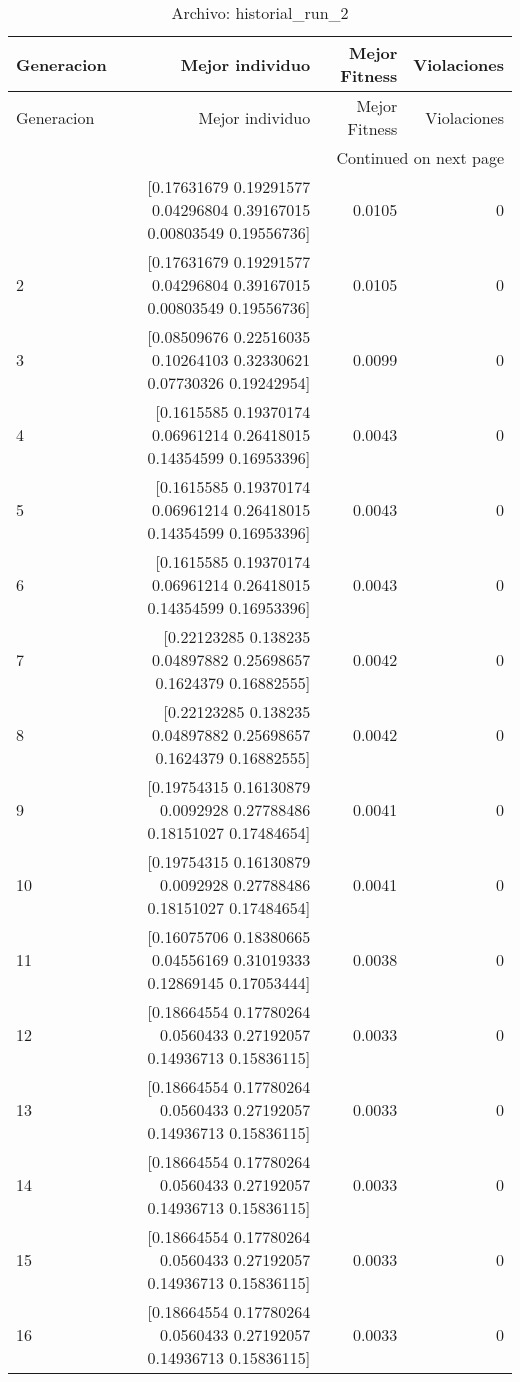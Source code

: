 \begin{longtable}{lrrr}
\caption{Archivo: historial\_run\_2}\label{tab:historial_run_2} \\
\toprule
Generacion & Mejor individuo & Mejor Fitness & Violaciones \\
\midrule
\endfirsthead
\toprule
Generacion & Mejor individuo & Mejor Fitness & Violaciones \\
\midrule
\endhead
\midrule
\multicolumn{4}{r}{Continued on next page} \\
\midrule
\endfoot
\bottomrule
\endlastfoot
1 & [0.17631679 0.19291577 0.04296804 0.39167015 0.00803549 0.19556736] & 0.0105 & 0 \\
2 & [0.17631679 0.19291577 0.04296804 0.39167015 0.00803549 0.19556736] & 0.0105 & 0 \\
3 & [0.08509676 0.22516035 0.10264103 0.32330621 0.07730326 0.19242954] & 0.0099 & 0 \\
4 & [0.1615585  0.19370174 0.06961214 0.26418015 0.14354599 0.16953396] & 0.0043 & 0 \\
5 & [0.1615585  0.19370174 0.06961214 0.26418015 0.14354599 0.16953396] & 0.0043 & 0 \\
6 & [0.1615585  0.19370174 0.06961214 0.26418015 0.14354599 0.16953396] & 0.0043 & 0 \\
7 & [0.22123285 0.138235   0.04897882 0.25698657 0.1624379  0.16882555] & 0.0042 & 0 \\
8 & [0.22123285 0.138235   0.04897882 0.25698657 0.1624379  0.16882555] & 0.0042 & 0 \\
9 & [0.19754315 0.16130879 0.0092928  0.27788486 0.18151027 0.17484654] & 0.0041 & 0 \\
10 & [0.19754315 0.16130879 0.0092928  0.27788486 0.18151027 0.17484654] & 0.0041 & 0 \\
11 & [0.16075706 0.18380665 0.04556169 0.31019333 0.12869145 0.17053444] & 0.0038 & 0 \\
12 & [0.18664554 0.17780264 0.0560433  0.27192057 0.14936713 0.15836115] & 0.0033 & 0 \\
13 & [0.18664554 0.17780264 0.0560433  0.27192057 0.14936713 0.15836115] & 0.0033 & 0 \\
14 & [0.18664554 0.17780264 0.0560433  0.27192057 0.14936713 0.15836115] & 0.0033 & 0 \\
15 & [0.18664554 0.17780264 0.0560433  0.27192057 0.14936713 0.15836115] & 0.0033 & 0 \\
16 & [0.18664554 0.17780264 0.0560433  0.27192057 0.14936713 0.15836115] & 0.0033 & 0 \\

\end{longtable}
